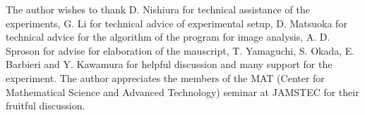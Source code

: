 \documentclass[default,iicol,10pt]{sn-jnl}%
\theoremstyle{thmstyleone}%
\theoremstyle{thmstyletwo}%
\theoremstyle{thmstylethree}%
\begin{document}
The author wishes to thank D. Nishiura for technical assistance of the experiments, G. Li for technical advice of experimental setup, D. Matsuoka for technical advice for the algorithm of the program for image analysis, A. D. Sproson for advise for elaboration of the mauscript,  T. Yamaguchi, S. Okada, E. Barbieri and Y. Kawamura for helpful discussion and many support for the experiment. The author appreciates the members of the MAT (Center for Mathematical Science and Advanced Technology) seminar at JAMSTEC for their fruitful discussion. 








\end{document}
